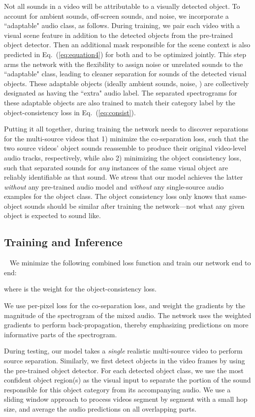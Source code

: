 \documentclass[10pt,twocolumn,letterpaper]{article}
\begin{document}
Not all sounds in a video will be attributable to a visually detected object.  To account for ambient sounds, off-screen sounds, and noise, we incorporate a  ``adaptable" audio class, as follows. During training, we pair each video with a visual scene feature in addition to the detected objects from the pre-trained object detector. Then an additional mask  responsible for the scene context is also predicted in Eq.~(\ref{eq:equation4}) for both  and  to be optimized jointly. This step arms the network with the flexibility to assign noise or unrelated sounds to the ``adaptable" class, leading to cleaner separation for sounds of the detected visual objects. These adaptable objects (ideally ambient sounds, noise, \etc) are collectively designated as having the ``extra"  audio label. The separated spectrograms for these adaptable objects are also trained to match their category label by the object-consistency loss in Eq.~(\ref{eq:consist}). 

Putting it all together, during training the network needs to discover separations for the multi-source videos that 1) minimize the co-separation loss, such that the two source videos' object sounds reassemble to produce their original video-level audio tracks, respectively, while also 2) minimizing the object consistency loss, such that separated sounds for \emph{any} instances of the same visual object are reliably identifiable as that sound.  We stress that our model achieves the latter \emph{without} any pre-trained audio model and \emph{without} any single-source audio examples for the object class.  The object consistency loss only knows that same-object sounds should be similar after training the network---not what any given object is expected to sound like.

\subsection{Training and Inference}~\label{sec:trainingAndInference}
We minimize the following combined loss function and train our network end to end:

where  is the weight for the object-consistency loss. 

We use per-pixel  loss for the co-separation loss, and weight the gradients by the magnitude of the spectrogram of the mixed audio. The network uses the weighted gradients to perform back-propagation, thereby emphasizing predictions on more informative parts of the spectrogram.

During testing, our model  takes a \emph{single} realistic multi-source video to perform source separation. Similarly, we first detect objects in the video frames by using the pre-trained object detector. For each detected object class, we use the most confident object region(s) as the visual input to separate the portion of the sound responsible for this object category from its accompanying audio. We use a sliding window approach to process videos segment by segment with a small hop size, and average the audio predictions on all overlapping parts.  
\end{document}
